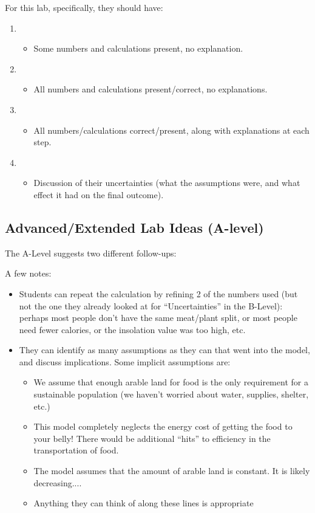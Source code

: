 \documentclass[fleqn,letterpaper]{article}
\begin{document}
For this lab, specifically, they should have:

\begin{enumerate}
 \item{
  \begin{itemize}
   \item{Some numbers and calculations present, no explanation.}
  \end{itemize}
}
 \item{
  \begin{itemize}
   \item{All numbers and calculations present/correct, no explanations.}
  \end{itemize}
}
 \item{
  \begin{itemize}
   \item{All numbers/calculations correct/present, along with explanations at each step.}
  \end{itemize}
}
 \item{
  \begin{itemize}
   \item{Discussion of their uncertainties (what the assumptions were, and what effect it had on the final outcome). }
  \end{itemize}
}
\end{enumerate}


\subsection*{Advanced/Extended Lab Ideas (A-level)}

The A-Level suggests two different follow-ups:

A few notes:

\begin{itemize}
 \item{Students can repeat the calculation by refining 2 of the numbers used (but not the one they already looked at for ``Uncertainties'' in the B-Level): perhaps most people don't have the same meat/plant split, or most people need fewer calories, or the insolation value was too high, etc.}
 \item{They can identify as many assumptions as they can that went into the model, and discuss implications.  Some implicit assumptions are:
 \begin{itemize}
 \item{We assume that enough arable land for food is the only requirement for a sustainable population (we haven't worried about water, supplies, shelter, etc.)}
 \item{This model completely neglects the energy cost of getting the food to your belly!  There would be additional ``hits'' to efficiency in the transportation of food.}
 \item{The model assumes that the amount of arable land is constant.  It is likely decreasing....}
 \item{Anything they can think of along these lines is appropriate}
 \end{itemize}}
\end{itemize}
\end{document}
